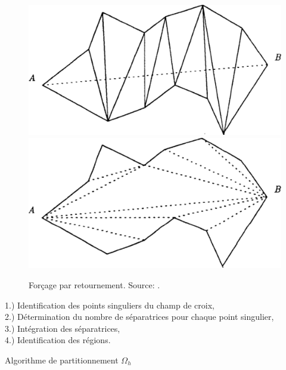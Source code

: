 \begin{figure}[h!]
\centering
\includegraphics[scale=0.275]{images/retourn_arete_george-1.pdf}\hfill
\includegraphics[scale=0.275]{images/retourn_arete_george-2.pdf}
\caption{Forçage par retournement. Source: \cite{georgegeneration}.}
\label{fig:retournement_arete_george}
\end{figure}

\vspace{0.5cm}
\begin{algorithm}[H]
\vspace{0.2cm}
1.) Identification des points singuliers du champ de croix,\\\vspace{0.2cm}
2.) Détermination du nombre de séparatrices pour chaque point singulier,\\\vspace{0.2cm}
3.) Intégration des séparatrices,\\\vspace{0.2cm}
4.) Identification des régions.\\\vspace{0.2cm}
\caption{Algorithme de partitionnement $\Omega_h$}
\end{algorithm}
\vspace{0.5cm}





